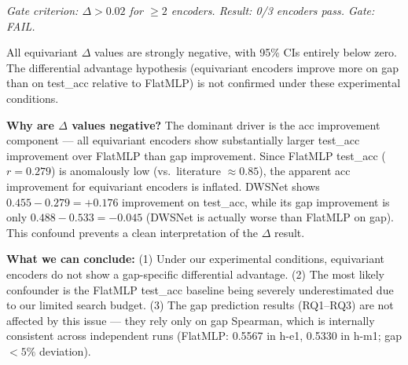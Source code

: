 \noindent\textit{Gate criterion: $\Delta > 0.02$ for $\geq 2$ encoders. Result: 0/3 encoders pass. Gate: FAIL.}

All equivariant $\Delta$ values are strongly negative, with 95\% CIs entirely below zero. The differential
advantage hypothesis (equivariant encoders improve more on gap than on test\_acc relative to FlatMLP)
is not confirmed under these experimental conditions.

\textbf{Why are $\Delta$ values negative?} The dominant driver is the acc improvement
component --- all equivariant encoders show substantially larger test\_acc improvement over FlatMLP than
gap improvement. Since FlatMLP test\_acc ($r = 0.279$) is anomalously low (vs.\ literature $\approx 0.85$), the
apparent acc improvement for equivariant encoders is inflated. DWSNet shows $0.455 - 0.279 = +0.176$
improvement on test\_acc, while its gap improvement is only $0.488 - 0.533 = -0.045$ (DWSNet is actually
worse than FlatMLP on gap). This confound prevents a clean interpretation of the $\Delta$ result.

\textbf{What we can conclude:} (1) Under our experimental conditions, equivariant encoders do not show a
gap-specific differential advantage. (2) The most likely confounder is the FlatMLP test\_acc baseline
being severely underestimated due to our limited search budget. (3) The gap prediction results (RQ1--RQ3)
are not affected by this issue --- they rely only on gap Spearman, which is internally consistent across
independent runs (FlatMLP: 0.5567 in h-e1, 0.5330 in h-m1; gap $< 5\%$ deviation).
